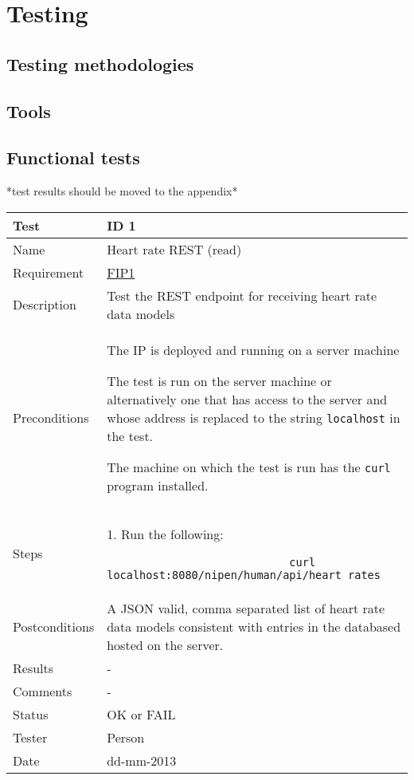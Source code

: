 
\chapter{Testing}
\label{Testing}

\section{Testing methodologies}

\section{Tools}

\section{Functional tests}

*test results should be moved to the appendix*

\begin{table}
\begin{center}
\begin{tabular}{ | l | p{10cm} | }
	\hline
	\textbf{Test}	&	\textbf{ID 1} \\
	\hline\noalign{\smallskip}\noalign{\smallskip}\hline
	Name				& Heart rate REST (read) \\
	Requirement			& \hyperref[table:reqip]{FIP1} \\
	Description			& Test the REST endpoint for receiving heart rate data models \\
	Preconditions		& 	\par The IP is deployed and running on a server machine 
							\par The test is run on the server machine or alternatively
							one that has access to the server and whose address is replaced to the
							string \verb|localhost| in the test.
							\par The machine on which the test is run has the \verb|curl| program installed. \\
	Steps 				&	1. Run the following:
							\begin{verbatim}
							curl localhost:8080/nipen/human/api/heart_rates
							\end{verbatim}
							\\
	Postconditions		& A JSON valid, comma separated list of heart rate data models consistent with 
							entries in the databased hosted on the server. \\
	Results				& - \\
	Comments			& - \\
	Status				& OK or FAIL \\
	Tester				& Person \\
	Date				& dd-mm-2013 \\
	\hline
\end{tabular}
\end{center}
\end{table}

